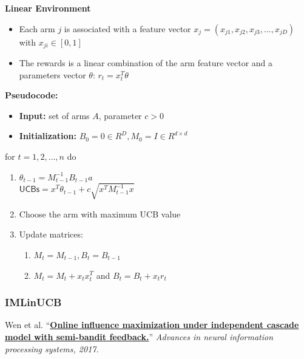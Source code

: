 \documentclass[10pt,a4paper]{article}
\begin{document}
\textbf{Linear Environment}

\begin{itemize}

\item Each arm $j$ is associated with a feature vector $x_{j} = (x_{j1}, x_{j2}, x_{j3}, \ldots, x_{jD})$ with $x_{ji} \in [0,1]$
\item The rewards is a linear combination of the arm feature vector and a parameters vector $\theta$: $r_t = x_t^T \theta$
\end{itemize}

\textbf{Pseudocode:}
\begin{itemize}
\item \textbf{Input:} set of arms $A$, parameter $c>0$
\item \textbf{Initialization:} $B_0 = 0 \in R^D, M_0 = I \in R^{d \times d}$
\end{itemize}

\begin{shaded}
for $t=1, 2, \ldots, n$ do
\begin{enumerate}
\item $\theta_{t-1} = M_{t-1}^{-1} B_{t-1}a$\\
$\mathsf{UCBs} = x^T \theta_{t-1} + c \sqrt{x^T M_{t-1}^{-1} x}$
\item Choose the arm with maximum UCB value
\item Update matrices:
\begin{enumerate}
\item $M_t = M_{t-1}, B_t = B_{t-1}$
\item $M_t = M_t + x_t x_t^T$ and $B_t = B_t + x_t r_t$
\end{enumerate}
\end{enumerate}
\end{shaded}


\subsubsection{IMLinUCB}\label{imlinucb}

Wen et al. ``\href{https://dl.acm.org/doi/10.5555/3294996.3295062}{\textbf{Online influence maximization under independent cascade model with semi-bandit feedback.}}'' \textit{Advances in neural information processing systems, 2017.}
\end{document}
